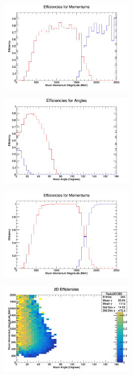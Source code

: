 \documentclass[11pt]{article}
\begin{document}
\begin{figure}[H]
\centering
\includegraphics[width=0.6\textwidth]{NMCombinedPlotsImages/4-NMCombinedPlots.png}
\caption{}
\end{figure}

\begin{figure}[H]
\centering
\includegraphics[width=0.6\textwidth]{NMCombinedPlotsImages/5-NMCombinedPlots.png}
\caption{}
\end{figure}

\begin{figure}[H]
\centering
\includegraphics[width=0.6\textwidth]{NMCombinedPlotsImages/6-NMCombinedPlots.png}
\caption{}
\end{figure}

\begin{figure}[H]
\centering
\includegraphics[width=0.6\textwidth]{NMCombinedPlotsImages/7-NMCombinedPlots.png}
\caption{}
\end{figure}
\end{document}
